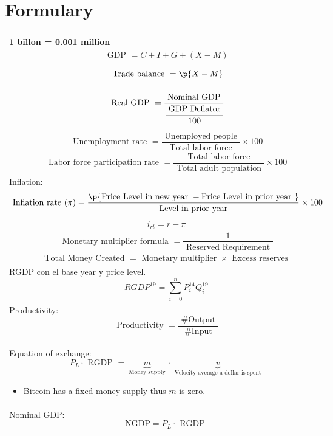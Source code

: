 \documentclass[openany]{book}
\begin{document}
\chapter{Formulary}
\begin{center}
    \begin{supertabular}{ |p{16cm}| }
         billon = 0.001 million \\ 
        \hline
            \[
                \text{ GDP } = C + I + G + (X-M)
            \] \\
        \hline
            \[
                \text{ Trade balance } = \p{X - M} 
            \] \\
        \hline
            \[
                \text{ Real GDP } = \frac{\text{ Nominal GDP }}{\cfrac{\text{ GDP Deflator }}{100}} 
            \] \\
        \hline
            \[
                \text{ Unemployment rate } = \frac{\text{ Unemployed people }}{\text{ Total labor force }} \times 100 
            \] \\
        \hline
            \[
                \text{ Labor force participation rate } = \frac{\text{ Total labor force }}{\text{ Total adult population }} \times 100
            \] \\
        \hline
        Inflation: 
            \[
                \text{ Inflation rate }(\pi) = \frac{\p{\text{Price Level in new year } - \text{Price Level in prior year }} }{\text{ Level in prior year }} \times 100
            \] \\
        \hline
            \[ 
                i_{rt} = r - \pi  
            \] \\ 
        \hline
        \[
            \text{ Monetary multiplier formula } = \frac{1}{\text{ Reserved Requirement }} 
        \] \\
        \hline
        \[
          \text{ Total Money Created } = \text{ Monetary multiplier } \times \text{ Excess reserves }
        \] \\
        \hline
        RGDP con el base year y price level. 
        \[
          RGDP^{19} = \sum_{i=0}^{n}P_{i}^{14} Q_{i}^{19}
        \] \\ 
        \hline 
        Productivity:  
        \[
            \text{ Productivity } = \frac{\text{ \#Output }}{\text{ \#Input }} 
        \] \\ 
        \hline
        Equation of exchange: 
        \[
          P_L \cdot \text{ RGDP } = \underbrace{m}_{\text{ Money supply }} \cdot \underbrace{v}_{\text{ Velocity average a dollar is spent }}
        \] \begin{itemize}
            \item Bitcoin has a fixed money supply thus $m$ is zero. 
        \end{itemize}\\ 
        \hline
        Nominal GDP: 
        \[
          \text{NGDP} = P_L \cdot \text{ RGDP }
        \] \\ 
        \hline
    \end{supertabular}
\end{center}
\end{document}
